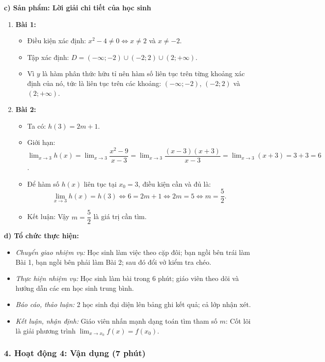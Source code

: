 \documentclass[12pt, a4paper]{article}
\begin{document}
\noindent \textbf{c) Sản phẩm: Lời giải chi tiết của học sinh}
\begin{enumerate}[leftmargin=0.6cm]
    \item \textbf{Bài 1:}
    \begin{itemize}
        \item Điều kiện xác định: $x^2 - 4 \neq 0 \iff x \neq 2$ và $x \neq -2$.
        \item Tập xác định: $D = (-\infty; -2) \cup (-2; 2) \cup (2; +\infty)$.
        \item Vì $y$ là hàm phân thức hữu tỉ nên hàm số liên tục trên từng khoảng xác định của nó, tức là liên tục trên các khoảng: $(-\infty; -2)$, $(-2; 2)$ và $(2; +\infty)$.
    \end{itemize}
    \item \textbf{Bài 2:}
    \begin{itemize}
        \item Ta có: $h(3) = 2m + 1$.
        \item Giới hạn: $\lim_{x \to 3} h(x) = \lim_{x \to 3} \dfrac{x^2 - 9}{x - 3} = \lim_{x \to 3} \dfrac{(x-3)(x+3)}{x-3} = \lim_{x \to 3} (x + 3) = 3 + 3 = 6$.
        \item Để hàm số $h(x)$ liên tục tại $x_0 = 3$, điều kiện cần và đủ là:
        $$\lim_{x \to 3} h(x) = h(3) \iff 6 = 2m + 1 \iff 2m = 5 \iff m = \dfrac{5}{2}.$$
        \item Kết luận: Vậy $m = \dfrac{5}{2}$ là giá trị cần tìm.
    \end{itemize}
\end{enumerate}

\noindent \textbf{d) Tổ chức thực hiện:}
\begin{itemize}[leftmargin=0.8cm]
    \item \textit{Chuyển giao nhiệm vụ:} Học sinh làm việc theo cặp đôi; bạn ngồi bên trái làm Bài 1, bạn ngồi bên phải làm Bài 2; sau đó đổi vở kiểm tra chéo.
    \item \textit{Thực hiện nhiệm vụ:} Học sinh làm bài trong 6 phút; giáo viên theo dõi và hướng dẫn các em học sinh trung bình.
    \item \textit{Báo cáo, thảo luận:} 2 học sinh đại diện lên bảng ghi kết quả; cả lớp nhận xét.
    \item \textit{Kết luận, nhận định:} Giáo viên nhấn mạnh dạng toán tìm tham số $m$: Cốt lõi là giải phương trình $\lim_{x \to x_0} f(x) = f(x_0)$.
\end{itemize}

\subsubsection*{4. Hoạt động 4: Vận dụng (7 phút)}
\end{document}
